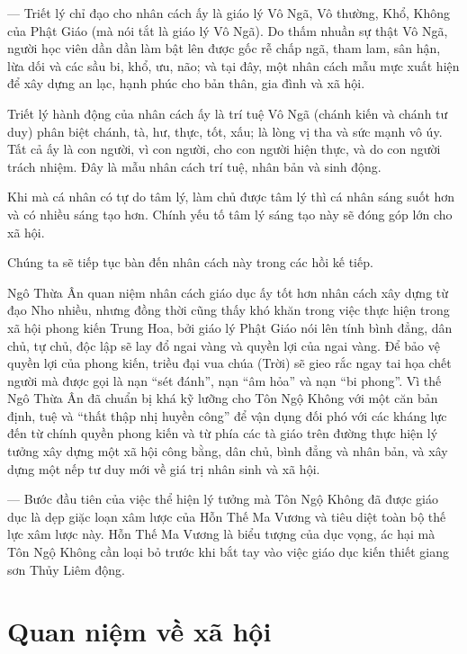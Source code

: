 — Triết lý chỉ đạo cho nhân cách ấy là giáo lý Vô Ngã, Vô thường, Khổ, Không của Phật Giáo (mà nói tắt là giáo lý Vô Ngã). Do thấm nhuần sự thật Vô Ngã, người học viên dần dần làm bật lên được gốc rễ chấp ngã, tham lam, sân hận, lừa dối và các sầu bi, khổ, ưu, não; và tại đây, một nhân cách mẫu mực xuất hiện để xây dựng an lạc, hạnh phúc cho bản thân, gia đình và xã hội.

Triết lý hành động của nhân cách ấy là trí tuệ Vô Ngã (chánh kiến và chánh tư duy) phân biệt chánh, tà, hư, thực, tốt, xấu; là lòng vị tha và sức mạnh vô úy. Tất cả ấy là con người, vì con người, cho con người hiện thực, và do con người trách nhiệm. Đây là mẫu nhân cách trí tuệ, nhân bản và sinh động.

Khi mà cá nhân có tự do tâm lý, làm chủ được tâm lý thì cá nhân sáng suốt hơn và có nhiều sáng tạo hơn. Chính yếu tố tâm lý sáng tạo này sẽ đóng góp lớn cho xã hội.

Chúng ta sẽ tiếp tục bàn đến nhân cách này trong các hồi kế tiếp.

Ngô Thừa Ân quan niệm nhân cách giáo dục ấy tốt hơn nhân cách xây dựng từ đạo Nho nhiều, nhưng đồng thời cũng thấy khó khăn trong việc thực hiện trong xã hội phong kiến Trung Hoa, bởi giáo lý Phật Giáo nói lên tính bình đẳng, dân chủ, tự chủ, độc lập sẽ lay đổ ngai vàng và quyền lợi của ngai vàng. Để bảo vệ quyền lợi của phong kiến, triều đại vua chúa (Trời) sẽ gieo rắc ngay tai họa chết người mà được gọi là nạn ``sét đánh'', nạn ``âm hỏa'' và nạn ``bi phong''. Vì thế Ngô Thừa Ân đã chuẩn bị khá kỹ lưỡng cho Tôn Ngộ Không với một căn bản định, tuệ và ``thất thập nhị huyền công'' để vận dụng đối phó với các kháng lực đến từ chính quyền phong kiến và từ phía các tà giáo trên đường thực hiện lý tưởng xây dựng một xã hội công bằng, dân chủ, bình đẳng và nhân bản, và xây dựng một nếp tư duy mới về giá trị nhân sinh và xã hội.

— Bước đầu tiên của việc thể hiện lý tưởng mà Tôn Ngộ Không đã được giáo dục là dẹp giặc loạn xâm lược của Hỗn Thế Ma Vương và tiêu diệt toàn bộ thế lực xâm lược này. Hỗn Thế Ma Vương là biểu tượng của dục vọng, ác hại mà Tôn Ngộ Không cần loại bỏ trước khi bắt tay vào việc giáo dục kiến thiết giang sơn Thủy Liêm động.


\section{Quan niệm về xã hội} %
\label{sec:2_quan_niem_ve_xa_hoi}


